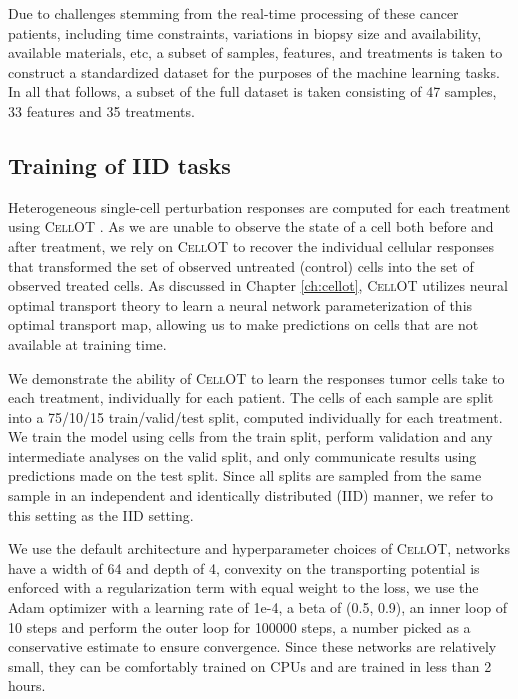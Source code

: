 Due to challenges stemming from the real-time processing of these cancer patients, including time constraints, variations in biopsy size and availability, available materials, etc, a subset of samples, features, and treatments is taken to construct a standardized dataset for the purposes of the machine learning tasks.
In all that follows, a subset of the full dataset is taken consisting of 47 samples, 33 features and 35 treatments.



\subsection{Training of IID tasks}
Heterogeneous single-cell perturbation responses are computed for each treatment using \textsc{CellOT} \cite{bunne2023}.
As we are unable to observe the state of a cell both before and after treatment, we rely on \textsc{CellOT} to recover the individual cellular responses that transformed the set of observed untreated (control) cells into the set of observed treated cells.
As discussed in Chapter \ref{ch:cellot}, \textsc{CellOT} utilizes neural optimal transport theory to learn a neural network parameterization of this optimal transport map, allowing us to make predictions on cells that are not available at training time.

We demonstrate the ability of \textsc{CellOT} to learn the responses tumor cells take to each treatment, individually for each patient. The cells of each sample are split into a 75/10/15 train/valid/test split, computed individually for each treatment. We train the model using cells from the train split, perform validation and any intermediate analyses on the valid split, and only communicate results using predictions made on the test split. Since all splits are sampled from the same sample in an independent and identically distributed (IID) manner, we refer to this setting as the IID setting.

We use the default architecture and hyperparameter choices of \textsc{CellOT}, networks have a width of 64 and depth of 4, convexity on the transporting potential is enforced with a regularization term with equal weight to the loss, we use the Adam optimizer \cite{kingma2014} with a learning rate of 1e-4, a beta of (0.5, 0.9), an inner loop of 10 steps and perform the outer loop for 100000 steps, a number picked as a conservative estimate to ensure convergence. Since these networks are relatively small, they can be comfortably trained on CPUs and are trained in less than 2 hours. 

